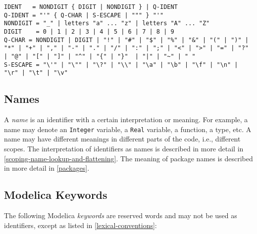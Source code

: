 \begin{lstlisting}[language=grammar]
IDENT   = NONDIGIT { DIGIT | NONDIGIT } | Q-IDENT
Q-IDENT = "'" { Q-CHAR | S-ESCAPE | """ } "'"
NONDIGIT = "_" | letters "a" ... "z" | letters "A" ... "Z"
DIGIT    = 0 | 1 | 2 | 3 | 4 | 5 | 6 | 7 | 8 | 9
Q-CHAR = NONDIGIT | DIGIT | "!" | "#" | "$" | "%" | "&" | "(" | ")" | "*" | "+" | "," | "-" | "." | "/" | ":" | ";" | "<" | ">" | "=" | "?" | "@" | "[" | "]" | "^" | "{" | "}"  | "|" | "~" | " "
S-ESCAPE = "\'" | "\"" | "\?" | "\\" | "\a" | "\b" | "\f" | "\n" | "\r" | "\t" | "\v"
\end{lstlisting}

\subsection{Names}

A \emph{name} is an identifier with a certain interpretation or meaning.
For example, a name may denote an \lstinline!Integer! variable, a \lstinline!Real! variable, a
function, a type, etc. A name may have different meanings in different
parts of the code, i.e., different scopes. The interpretation of
identifiers as names is described in more detail in \autoref{scoping-name-lookup-and-flattening}. The
meaning of package names is described in more detail in \autoref{packages}.

\subsection{Modelica Keywords}

The following Modelica \emph{keywords} are reserved words and may not be
used as identifiers, except as listed in \autoref{lexical-conventions}:

